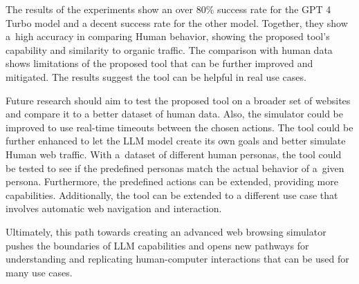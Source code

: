 The results of the experiments show an over 80\% success rate for the GPT 4 Turbo model and a decent success rate for the other model. Together, they show a~high accuracy in comparing Human behavior, showing the proposed tool's capability and similarity to organic traffic. The comparison with human data shows limitations of the proposed tool that can be further improved and mitigated. The results suggest the tool can be helpful in real use cases.

Future research should aim to test the proposed tool on a broader set of websites and compare it to a better dataset of human data. Also, the simulator could be improved to use real-time timeouts between the chosen actions. The tool could be further enhanced to let the LLM model create its own goals and better simulate Human web traffic. With a~dataset of different human personas, the tool could be tested to see if the predefined personas match the actual behavior of a~given persona. Furthermore, the predefined actions can be extended, providing more capabilities. Additionally, the tool can be extended to a different use case that involves automatic web navigation and interaction. 

Ultimately, this path towards creating an advanced web browsing simulator pushes the boundaries of LLM capabilities and opens new pathways for understanding and replicating human-computer interactions that can be used for many use cases. 




% 